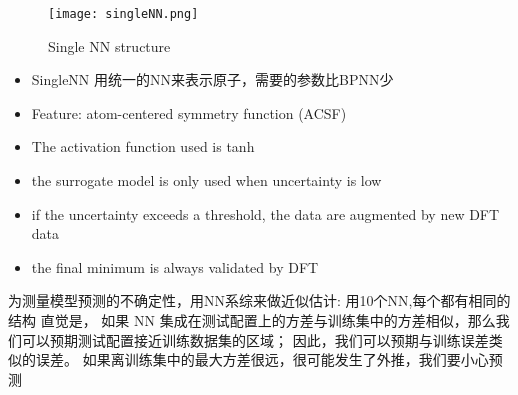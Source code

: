 \documentclass[xcolor=x11names,UTF8]{ctexbeamer}
\begin{document}
    \begin{frame}

  \begin{figure}
      \centering
      \texttt{[image: singleNN.png]}
      \caption{\small \textrm{Single NN structure}}
  \end{figure}

  \begin{itemize}
  \item SingleNN  用统一的NN来表示原子，需要的参数比BPNN少
  \item Feature: atom-centered symmetry function (ACSF)
  \item  The activation function used is tanh
  \end{itemize}
\end{frame}
\begin{frame}
   \begin{itemize}
   \item the surrogate model is only used when uncertainty is low
   \item if the uncertainty exceeds a threshold, the data are augmented by new DFT data
   \item the final minimum is always validated by DFT
   \end{itemize}
\end{frame}

\begin{frame}
  为测量模型预测的不确定性，用NN系综来做近似估计: 用10个NN,每个都有相同的结构
  直觉是，
  如果 NN 集成在测试配置上的方差与训练集中的方差相似，那么我们可以预期测试配置接近训练数据集的区域；
  因此，我们可以预期与训练误差类似的误差。
  如果离训练集中的最大方差很远，很可能发生了外推，我们要小心预测
\end{frame}
\end{document}
